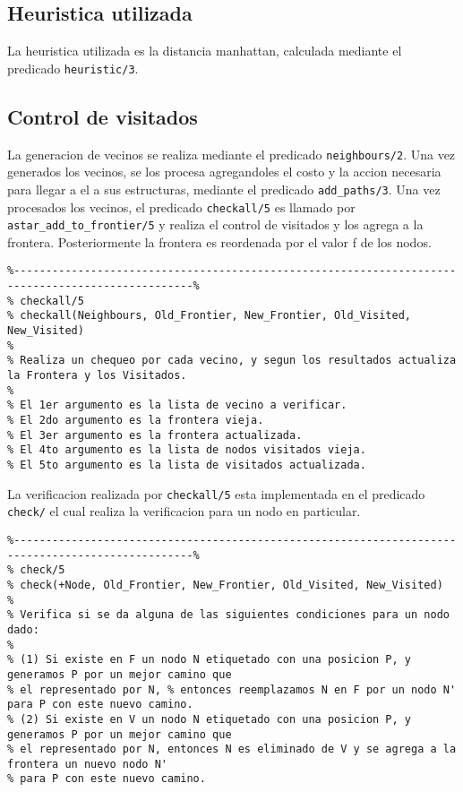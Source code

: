 \documentclass[a4paper,12pt]{report}
\begin{document}
\subsection{Heuristica utilizada}

La heuristica utilizada es la distancia manhattan, calculada mediante el predicado \texttt{heuristic/3}.

\subsection{Control de visitados}

La generacion de vecinos se realiza mediante el predicado \texttt{neighbours/2}.
Una vez generados los vecinos, se los procesa agregandoles el costo y la accion necesaria para llegar
a el a sus estructuras, mediante el predicado \texttt{add\_paths/3}.
Una vez procesados los vecinos, el predicado \texttt{checkall/5} es llamado por \texttt{astar\_add\_to\_frontier/5} y realiza el control de visitados y 
los agrega a la frontera. Posteriormente la frontera es reordenada por el valor f de los nodos. 

\begin{scriptsize}
\begin{verbatim}
%--------------------------------------------------------------------------------------------------%
% checkall/5
% checkall(Neighbours, Old_Frontier, New_Frontier, Old_Visited, New_Visited)
% 
% Realiza un chequeo por cada vecino, y segun los resultados actualiza la Frontera y los Visitados.
%
% El 1er argumento es la lista de vecino a verificar.
% El 2do argumento es la frontera vieja.
% El 3er argumento es la frontera actualizada.
% El 4to argumento es la lista de nodos visitados vieja.
% El 5to argumento es la lista de visitados actualizada.
\end{verbatim}
\end{scriptsize}

La verificacion realizada por \texttt{checkall/5} esta implementada en el predicado \texttt{check/}
el cual realiza la verificacion para un nodo en particular.

\begin{scriptsize}
\begin{verbatim}
%--------------------------------------------------------------------------------------------------%
% check/5
% check(+Node, Old_Frontier, New_Frontier, Old_Visited, New_Visited)
%
% Verifica si se da alguna de las siguientes condiciones para un nodo dado:
%
% (1) Si existe en F un nodo N etiquetado con una posicion P, y generamos P por un mejor camino que 
% el representado por N, % entonces reemplazamos N en F por un nodo N' para P con este nuevo camino.
% (2) Si existe en V un nodo N etiquetado con una posicion P, y generamos P por un mejor camino que 
% el representado por N, entonces N es eliminado de V y se agrega a la frontera un nuevo nodo N' 
% para P con este nuevo camino.
\end{verbatim}
\end{scriptsize}
\end{document}
